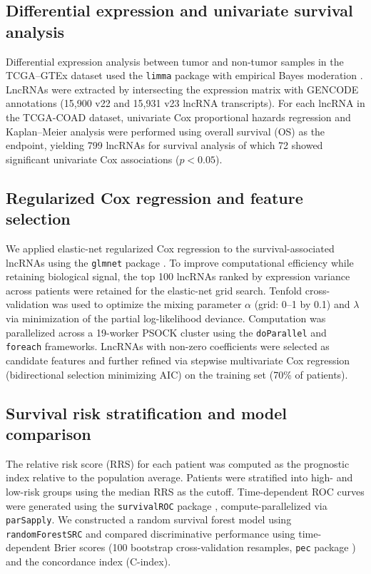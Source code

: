 \documentclass[11pt,a4paper]{article}
\begin{document}
\subsection{Differential expression and univariate survival analysis}

Differential expression analysis between tumor and non-tumor samples in the TCGA--GTEx dataset used the \texttt{limma} package with empirical Bayes moderation \citep{RN26}. LncRNAs were extracted by intersecting the expression matrix with GENCODE annotations (15,900 v22 and 15,931 v23 lncRNA transcripts). For each lncRNA in the TCGA-COAD dataset, univariate Cox proportional hazards regression and Kaplan--Meier analysis were performed using overall survival (OS) as the endpoint, yielding 799 lncRNAs for survival analysis of which 72 showed significant univariate Cox associations ($p < 0.05$).

\subsection{Regularized Cox regression and feature selection}

We applied elastic-net regularized Cox regression to the survival-associated lncRNAs using the \texttt{glmnet} package \citep{RN27}. To improve computational efficiency while retaining biological signal, the top 100 lncRNAs ranked by expression variance across patients were retained for the elastic-net grid search. Tenfold cross-validation was used to optimize the mixing parameter $\alpha$ (grid: 0--1 by 0.1) and $\lambda$ via minimization of the partial log-likelihood deviance. Computation was parallelized across a 19-worker PSOCK cluster using the \texttt{doParallel} and \texttt{foreach} frameworks. LncRNAs with non-zero coefficients were selected as candidate features and further refined via stepwise multivariate Cox regression (bidirectional selection minimizing AIC) on the training set (70\% of patients).

\subsection{Survival risk stratification and model comparison}

The relative risk score (RRS) for each patient was computed as the prognostic index relative to the population average. Patients were stratified into high- and low-risk groups using the median RRS as the cutoff. Time-dependent ROC curves were generated using the \texttt{survivalROC} package \citep{RN30}, compute-parallelized via \texttt{parSapply}. We constructed a random survival forest model using \texttt{randomForestSRC} \citep{RN31} and compared discriminative performance using time-dependent Brier scores (100 bootstrap cross-validation resamples, \texttt{pec} package \citep{RN32}) and the concordance index (C-index).
\end{document}
